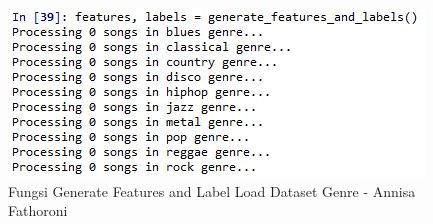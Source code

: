 \begin{enumerate}
\begin{itemize}
\begin{figure}[!hbtp]
\centering
\includegraphics[scale=0.7]{figures/Chapter6AnnisaFathoroni18.jpg}
\caption{Fungsi Generate Features and Label Load Dataset Genre - Annisa Fathoroni}
\label{Fungsi Generate Features and Label Load Dataset Genre - Annisa Fathoroni}
\end{figure}

\end{itemize}

\end{enumerate}